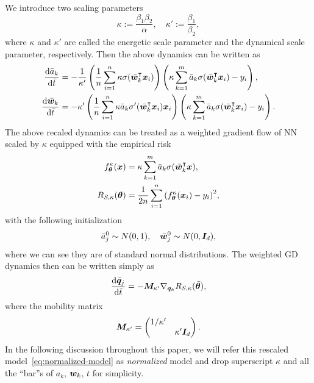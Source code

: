 \documentclass{article}
\begin{document}
We introduce two scaling parameters
\begin{equation}
    \kappa := \frac{\beta_1\beta_2}{\alpha}, \quad \kappa' :=\frac{\beta_1}{\beta_2},
\end{equation}
where $\kappa$ and $\kappa'$ are called the energetic scale parameter and the dynamical scale parameter, respectively. Then the above dynamics can be written as
\begin{align*}
    \frac{\mathrm{d} \bar{a}_k}{\mathrm{d} \bar{t}}
     & = -\frac{1}{\kappa'}\left(\frac{1}{n}\sum_{i=1}^n \kappa\sigma(\bar{\bm{w}}_k^\intercal\bm{x}_i)\right) \left(\kappa\sum_{k=1}^{m}\bar{a}_k\sigma(\bar{\bm{w}}_k^\intercal\bm{x}_i)-y_i\right), \\
    \frac{\mathrm{d} \bar{\bm{w}}_k}{\mathrm{d} \bar{t}}
     & = -\kappa'\left(\frac{1}{n}\sum_{i=1}^n\kappa \bar{a}_k\sigma'(\bar{\bm{w}}_k^\intercal\bm{x}_i)\bm{x}_i\right) \left(\kappa\sum_{k=1}^{m}\bar{a}_k\sigma(\bar{\bm{w}}_k^\intercal\bm{x}_i)-y_i\right).
\end{align*}
The above recaled dynamics can be treated as a weighted gradient flow of NN scaled by $\kappa$ equipped with the empirical risk
\begin{align}\label{eq:normalized-model}
    f^{\kappa}_{\bm{\theta}}(\bm{x})
     & = \kappa\sum_{k=1}^{m}\bar{a}_k\sigma(\bar{\bm{w}}_k^\intercal\bm{x}),         \\
    R_{S, \kappa}(\bm{\theta})
     & =\frac{1}{2n}\sum_{i=1}^n{(f^{\kappa}_{\bm{\theta}}(\bm{x}_i)-y_i)}^2,
\end{align}
with the following initialization
\begin{equation}
    \bar{a}_j^0\sim N(0,1), \quad \bar{\bm{w}}_j^0\sim N(0,\bm{I}_d),
\end{equation}
where we can see they are of standard normal distributions. The weighted GD dynamics then can be written simply as
\begin{equation}
    \frac{\mathrm{d}\bar{\bm{q}}_j}{\mathrm{d} \bar{t}} = -\bm{M}_{\kappa'}\nabla_{\bm{q}_k}R_{S,\kappa}(\bar{\bm{\theta}}),
\end{equation}
where the mobility matrix
\begin{equation}
    \bm{M}_{\kappa'} =
    \begin{pmatrix}
        1/\kappa' &         \\
                          & \kappa'\bm{I}_d 
    \end{pmatrix}.
\end{equation}
In the following discussion throughout this paper, we will refer this rescaled model~\eqref{eq:normalized-model} as \emph{normalized} model and drop superscript $\kappa$ and all the ``bar''s of $a_k$, $\bm{w}_k$, $t$ for simplicity. 
\end{document}
